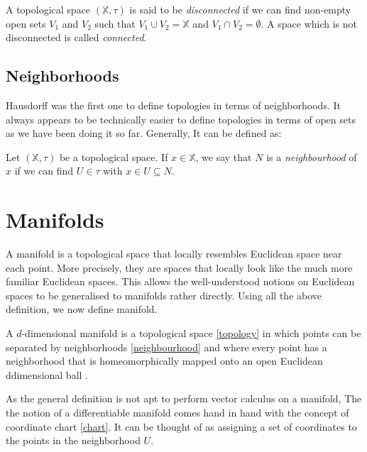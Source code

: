 \begin{definition}\label{disconnected} 
A topological space $(\mathbb{X},\tau)$ is said to be \emph{disconnected} if we can find non-empty
open sets $V_1$ and $V_2$ such that $V_1\cup V_2=\mathbb{X}$
and $V_1\cap V_2=\emptyset$. A space which is not disconnected is called \emph{connected}.
\end{definition}

\subsection{Neighborhoods}

Hausdorff was the first one to define topologies in terms of neighborhoods. It always appears to be technically easier to define topologies in terms of open sets as we have been doing it so far. Generally, It can be defined as:
\begin{definition}\label{neighbourhood} 
Let $(\mathbb{X},\tau)$ be a topological space. If $x\in \mathbb{X}$, we say that $N$ is a \emph{neighbourhood} of $x$ if we can find $U\in\tau$ with $x\in U\subseteq N$.
\end{definition}

\section{Manifolds}
A manifold is a topological space that locally resembles Euclidean space near each point. More precisely, they are spaces that locally look like the much more familiar Euclidean spaces. This allows the well-understood notions on Euclidean spaces to be generalised to manifolds rather directly. Using all the above definition, we now define manifold.

\begin{definition}
A $d$-dimensional manifold is a topological space \ref{topology} in which 
points can be separated by neighborhoods \ref{neighbourhood} and where every point has a neighborhood that is homeomorphically mapped onto an open Euclidean ddimensional ball \citep{Thor2009}.
\end{definition}

As the general definition is not apt to perform vector calculus on a manifold, The the notion of a differentiable manifold comes hand in hand with the concept of coordinate chart \ref{chart}. It can be thought of as assigning a set of coordinates to the points in the neighborhood $U$.


